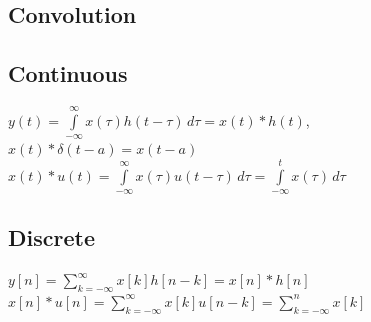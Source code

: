 \documentclass[]{article}
\begin{document}
\begin{multicols}{2}
    \section*{Convolution}
    \subsection*{Continuous}
    $y(t) = \int\limits_{-\infty}^{\infty} x(\tau)h(t-\tau)\, d\tau = x(t) * h(t)$, ~ $x(t) * \delta(t-a) = x(t-a)$\\
    $x(t)*u(t) = \int\limits_{-\infty}^{\infty} x(\tau) u(t-\tau)\, d\tau = \int\limits_{-\infty}^{t} x(\tau)\, d\tau$
    \subsection*{Discrete}
    $y[n] = \sum\limits_{k = -\infty}^{\infty} x[k]h[n-k] = x[n] * h[n]$\\
    $x[n]*u[n] = \sum\limits_{k=-\infty}^{\infty} x[k]u[n-k] = \sum\limits_{k=-\infty}^{n} x[k]$


\end{multicols}
\end{document}

